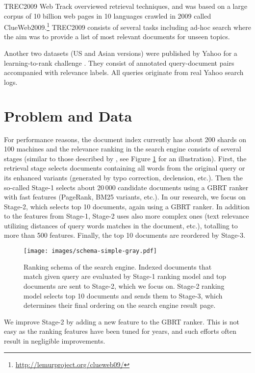 \documentclass[letterpaper]{article} \usepackage{aaai22 }  \usepackage{times}  \usepackage{helvet}  \usepackage{courier}  \usepackage[hyphens]{url}  \usepackage{graphicx} \usepackage{amsmath,amsfonts,amssymb, mathabx,bm,bbm}
\begin{document}
TREC2009 Web Track \cite{trec2009overview} overviewed retrieval techniques, and was based on a large corpus of 10 billion web pages in 10 languages crawled in 2009 called ClueWeb2009.\footnote{ \url{http://lemurproject.org/clueweb09/}} TREC2009 consists of several tasks including ad-hoc search where the aim was to provide a list of most relevant documents for unseen topics.

Another two datasets (US and Asian versions) were published by Yahoo for a learning-to-rank challenge \cite{chapelle2011yahoo}. They consist of annotated query-document pairs accompanied with relevance labels. All queries originate from real Yahoo search logs.

\section{Problem and Data}\label{sec:problem_data}

For performance reasons, the document index currently has about 200 shards on 100 machines and the relevance ranking in the search engine consists of several stages (similar to those described by \citet{yahoopaper}, see Figure \ref{fig:production_schema} for an illustration). First, the retrieval stage selects documents containing all words from the original query or its enhanced variants (generated by typo correction, declension, etc.). Then the so-called Stage-1 selects about 20\,000 candidate documents using a GBRT ranker with fast features (PageRank, BM25 variants, etc.). In our research, we focus on Stage-2, which selects top 10 documents, again using a GBRT ranker. In addition to the features from Stage-1, Stage-2 uses also more complex ones (text relevance utilizing distances of query words matches in the document, etc.), totalling to more than 500 features. Finally, the top 10 documents are reordered by Stage-3. 

\begin{figure}[!htb]
    \centering
    \texttt{[image: images/schema-simple-gray.pdf]}
    \caption{Ranking schema of the search engine. Indexed documents that match given query are evaluated by Stage-1 ranking model and top documents are sent to Stage-2, which we focus on. Stage-2 ranking model selects top 10 documents and sends them to Stage-3, which determines their final ordering on the search engine result page.}
    \label{fig:production_schema}
\end{figure}


We improve Stage-2 by adding a new feature to the GBRT ranker. This is not easy as the ranking features have been tuned for years, and such efforts often result in negligible improvements.
\end{document}
